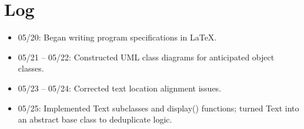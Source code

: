 \documentclass{article}
\begin{document}
\section{Log}
\begin{itemize}
    \item 05/20: Began writing program specifications in \LaTeX.
    \item 05/21 -- 05/22: Constructed UML class diagrams for anticipated object classes.
    \item 05/23 -- 05/24: Corrected text location alignment issues.
    \item 05/25: Implemented Text subclasses and display() functions; turned Text into an abstract base class to deduplicate logic.
\end{itemize}
\end{document}
